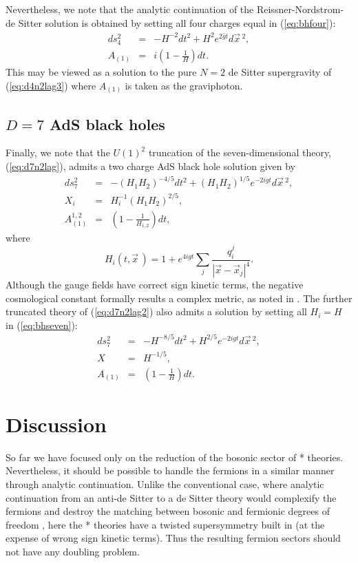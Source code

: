 \documentclass[a4paper,12pt]{article}
\begin{document}
Nevertheless, we note that the analytic continuation of the
Reissner-Nordstrom-de Sitter solution is obtained by setting all four
charges equal in (\ref{eq:bhfour}):
%
\begin{eqnarray}
ds_4^2&=&-H^{-2}dt^2 + H^2e^{2\hat gt}d\vec x\,^2,\nonumber\\
A_{(1)}&=&i\left(1-\frac{1}{H}\right)dt.
\end{eqnarray}
%
This may be viewed as a solution to the pure $N=2$ de Sitter supergravity
of (\ref{eq:d4n2lag3}) where $A_{(1)}$ is taken as the graviphoton.

\subsection{$D=7$ AdS black holes}

Finally, we note that the $U(1)^2$ truncation of the seven-dimensional theory,
(\ref{eq:d7n2lag}), admits a two charge AdS black hole solution given by 
%
\begin{eqnarray}
ds_7^2&=&-(H_1H_2)^{-4/5}dt^2 + (H_1H_2)^{1/5}e^{-2igt}d\vec x\,^2,\nonumber\\
X_i&=&H_i^{-1}(H_1H_2)^{2/5}, \nonumber\\
A_{(1)}^{1,2}&=&\left(1-\frac{1}{H_{1,2}}\right)dt,
\label{eq:bhseven}
\end{eqnarray}
%
where
%
\begin{equation}
H_i(t,\vec x\,)=1 + e^{4igt}\sum_j{\frac{q_i^j}{|\vec x-\vec x_j|^4}}.
\end{equation}
%
Although the gauge fields have correct sign kinetic terms, the negative
cosmological constant formally results a complex metric, as noted in
\cite{Liu}.  The further truncated theory of (\ref{eq:d7n2lag2}) also admits
a solution by setting all $H_i=H$ in (\ref{eq:bhseven}):
%
\begin{eqnarray}
ds_7^2&=&-H^{-8/5}dt^2 + H^{2/5}e^{-2igt}d\vec x\,^2,\nonumber\\
X&=&H^{-1/5}, \nonumber\\
A_{(1)}&=&\left(1-\frac{1}{H}\right)dt.
\end{eqnarray}

\section{Discussion}

So far we have focused only on the reduction of the bosonic sector of *
theories.  Nevertheless, it should be possible to handle the fermions in a
similar manner through analytic continuation.  Unlike the conventional case,
where analytic continuation from an anti-de Sitter to a de Sitter theory would
complexify the fermions and destroy the matching between bosonic and
fermionic degrees of freedom \cite{Pilch}, here the * theories have a twisted
supersymmetry built in (at the expense of wrong sign kinetic terms).  Thus
the resulting fermion sectors should not have any doubling problem.
\end{document}
